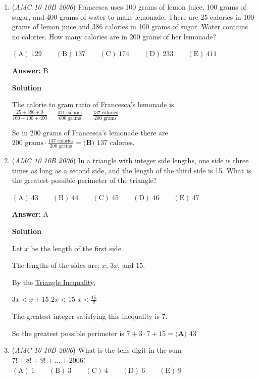 \begin{enumerate}
	\item (\textit{AMC 10 10B 2006}) Francesca uses 100 grams of lemon juice, 100 grams of sugar, and 400 grams of water to make lemonade. There are 25 calories in 100 grams of lemon juice and 386 calories in 100 grams of sugar. Water contains no calories. How many calories are in 200 grams of her lemonade? 


 $\mathrm{(A) \ } 129\qquad \mathrm{(B) \ } 137\qquad \mathrm{(C) \ } 174\qquad \mathrm{(D) \ } 233\qquad \mathrm{(E) \ } 411$

 \textbf{Answer: }B



\textbf{Solution}

The calorie to gram ratio of Francesca's lemonade is $\frac{25+386+0}{100+100+400}=\frac{411\textrm{ calories}}{600\textrm{ grams}}=\frac{137\textrm{ calories}}{200\textrm{ grams}}$ 

 So in $200\textrm{ grams}$ of Francesca's lemonade there are $200\textrm{ grams}\cdot\frac{137\textrm{ calories}}{200\textrm{ grams}}=\boxed{\textbf{(B) }137\textrm{ calories}}.$



	\item (\textit{AMC 10 10B 2006}) In a triangle with integer side lengths, one side is three times as long as a second side, and the length of the third side is 15. What is the greatest possible perimeter of the triangle? 


 $\mathrm{(A) \ } 43\qquad \mathrm{(B) \ } 44\qquad \mathrm{(C) \ } 45\qquad \mathrm{(D) \ } 46\qquad \mathrm{(E) \ } 47$

 \textbf{Answer: }A



\textbf{Solution}

Let $x$ be the length of the first side. 

 The lengths of the sides are: $x$, $3x$, and $15$. 

 By the \href{https://artofproblemsolving.com/wiki/index.php?title=Triangle\_Inequality}{Triangle Inequality},

 $3x < x + 15$
$2x < 15$
$x < \frac{15}{2}$

 The greatest integer satisfying this inequality is $7$.

 So the greatest possible perimeter is $7 + 3\cdot7 + 15 =\boxed{\textbf{(A) } 43}$



	\item (\textit{AMC 10 10B 2006}) What is the tens digit in the sum $7!+8!+9!+...+2006!$
$\mathrm{(A) \ } 1\qquad \mathrm{(B) \ } 3\qquad \mathrm{(C) \ } 4\qquad \mathrm{(D) \ } 6\qquad \mathrm{(E) \ } 9$


\end{enumerate}

